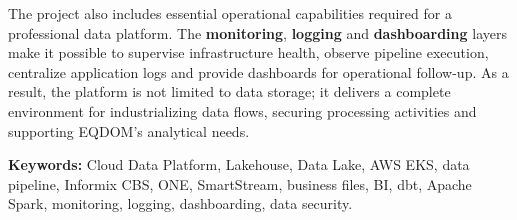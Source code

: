 The project also includes essential operational capabilities required for a professional data platform. The \textbf{monitoring}, \textbf{logging} and \textbf{dashboarding} layers make it possible to supervise infrastructure health, observe pipeline execution, centralize application logs and provide dashboards for operational follow-up. As a result, the platform is not limited to data storage; it delivers a complete environment for industrializing data flows, securing processing activities and supporting EQDOM's analytical needs.

\vspace{0.12cm}
\noindent\colorbox{lightpanel}{%
  \parbox{\dimexpr\linewidth-2\fboxsep\relax}{%
    \textbf{Keywords:} Cloud Data Platform, Lakehouse, Data Lake, AWS EKS, data pipeline, Informix CBS, ONE, SmartStream, business files, BI, dbt, Apache Spark, monitoring, logging, dashboarding, data security.
  }%
}
\endgroup

\clearpage
\endgroup
